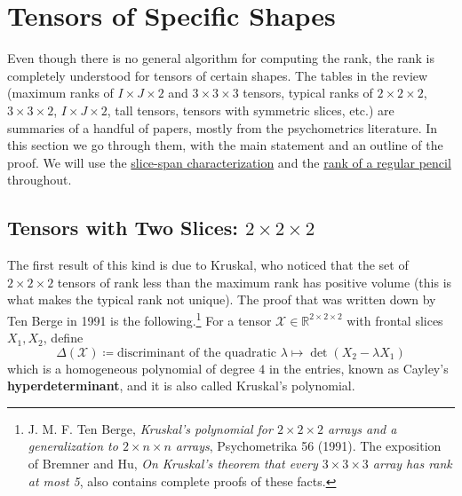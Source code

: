 \section{Tensors of Specific Shapes}

  \providecommand{\llbracket}{[\![}
  \providecommand{\rrbracket}{]\!]}
  \providecommand{\brank}{\underline{\mathrm{rank}}}

  Even though there is no general algorithm for computing the rank, the rank is completely understood for tensors of certain shapes. The tables in the review (maximum ranks of $I \times J \times 2$ and $3 \times 3 \times 3$ tensors, typical ranks of $2 \times 2 \times 2$, $3 \times 3 \times 2$, $I \times J \times 2$, tall tensors, tensors with symmetric slices, etc.) are summaries of a handful of papers, mostly from the psychometrics literature. In this section we go through them, with the main statement and an outline of the proof. We will use the \hyperref[lem:slice-span]{slice-span characterization} and the \hyperref[thm:pencil]{rank of a regular pencil} throughout.

\subsection{Tensors with Two Slices: $2 \times 2 \times 2$}

  The first result of this kind is due to Kruskal, who noticed that the set of $2 \times 2 \times 2$ tensors of rank less than the maximum rank has positive volume (this is what makes the typical rank not unique). The proof that was written down by Ten Berge in 1991 is the following.\footnote{J. M. F. Ten Berge, \textit{Kruskal's polynomial for $2 \times 2 \times 2$ arrays and a generalization to $2 \times n \times n$ arrays}, Psychometrika 56 (1991). The exposition of Bremner and Hu, \textit{On Kruskal's theorem that every $3 \times 3 \times 3$ array has rank at most 5}, also contains complete proofs of these facts.} For a tensor $\mathcal{X} \in \mathbb{R}^{2 \times 2 \times 2}$ with frontal slices $X_1, X_2$, define
  \begin{equation}
    \Delta(\mathcal{X}) \coloneqq \text{discriminant of the quadratic } \lambda \mapsto \det(X_2 - \lambda X_1)
  \end{equation}
  which is a homogeneous polynomial of degree $4$ in the entries, known as Cayley's \textbf{hyperdeterminant}, and it is also called Kruskal's polynomial.

